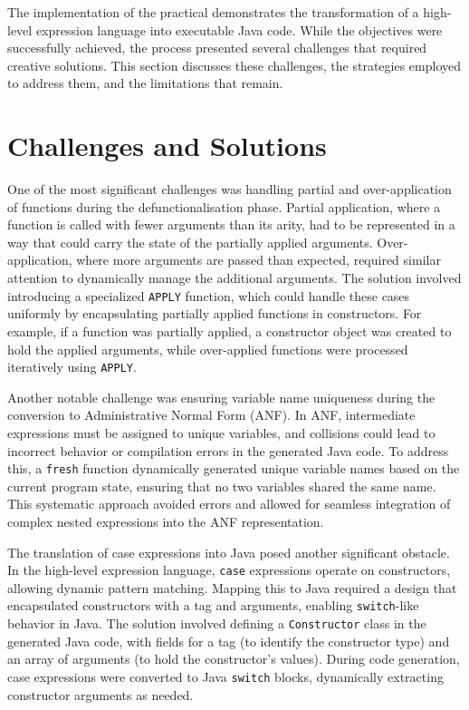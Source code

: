 \label{chapter:evaluation}

The implementation of the practical demonstrates the transformation of a
high-level expression language into executable Java code. While the objectives
were successfully achieved, the process presented several challenges that
required creative solutions. This section discusses these challenges, the
strategies employed to address them, and the limitations that remain.

\section{Challenges and Solutions}
One of the most significant challenges was handling partial and
over-application of functions during the defunctionalisation phase. Partial
application, where a function is called with fewer arguments than its arity,
had to be represented in a way that could carry the state of the partially
applied arguments. Over-application, where more arguments are passed than
expected, required similar attention to dynamically manage the additional
arguments. The solution involved introducing a specialized \texttt{APPLY} function,
which could handle these cases uniformly by encapsulating partially applied
functions in constructors. For example, if a function was partially applied, a
constructor object was created to hold the applied arguments, while
over-applied functions were processed iteratively using \texttt{APPLY}.

Another notable challenge was ensuring variable name uniqueness during
the conversion to Administrative Normal Form (ANF). In ANF, intermediate
expressions must be assigned to unique variables, and collisions could lead to
incorrect behavior or compilation errors in the generated Java code. To address
this, a \texttt{fresh} function dynamically generated unique variable names
based on the current program state, ensuring that no two variables shared the
same name. This systematic approach avoided errors and allowed for seamless
integration of complex nested expressions into the ANF representation.

The translation of case expressions into Java posed another
significant obstacle. In the high-level expression language, \texttt{case} expressions
operate on constructors, allowing dynamic pattern matching. Mapping this to
Java required a design that encapsulated constructors with a tag and arguments,
enabling \texttt{switch}-like behavior in Java. The solution involved defining a
\texttt{Constructor} class in the generated Java code, with fields for a tag (to
identify the constructor type) and an array of arguments (to hold the
constructor's values). During code generation, case expressions were converted
to Java \texttt{switch} blocks, dynamically extracting constructor arguments as needed.

